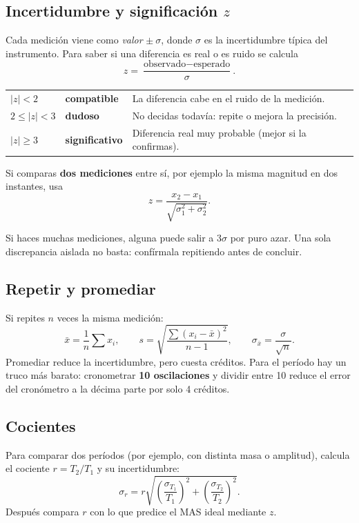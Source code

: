 \documentclass[11pt,a4paper]{article}
\begin{document}
\subsection{Incertidumbre y significación $z$}\label{sec:z}
Cada medición viene como \emph{valor} $\pm\ \sigma$, donde $\sigma$ es la incertidumbre típica del instrumento. Para saber si una diferencia es real o es ruido se calcula
\[
z = \frac{\text{observado} - \text{esperado}}{\sigma}.
\]
\begin{center}
\begin{tabular}{lll}
\toprule
$|z| < 2$ & \textcolor{ok}{\textbf{compatible}} & La diferencia cabe en el ruido de la medición. \\
$2 \le |z| < 3$ & \textcolor{aviso}{\textbf{dudoso}} & No decidas todavía: repite o mejora la precisión. \\
$|z| \ge 3$ & \textcolor{mal}{\textbf{significativo}} & Diferencia real muy probable (mejor si la confirmas). \\
\bottomrule
\end{tabular}
\end{center}

Si comparas \textbf{dos mediciones} entre sí, por ejemplo la misma magnitud en dos instantes, usa
\[
z = \frac{x_2 - x_1}{\sqrt{\sigma_1^2+\sigma_2^2}}.
\]

\begin{idea}
Si haces muchas mediciones, alguna puede salir a $3\sigma$ por puro azar. Una sola discrepancia aislada no basta: confírmala repitiendo antes de concluir.
\end{idea}

\subsection{Repetir y promediar}
Si repites $n$ veces la misma medición:
\[
\bar{x} = \frac{1}{n}\sum x_i, \qquad s = \sqrt{\frac{\sum (x_i-\bar x)^2}{n-1}}, \qquad \sigma_{\bar x} = \frac{\sigma}{\sqrt{n}}.
\]
Promediar reduce la incertidumbre, pero cuesta créditos. Para el período hay un truco más barato: cronometrar \textbf{10 oscilaciones} y dividir entre 10 reduce el error del cronómetro a la décima parte por solo 4 créditos.

\subsection{Cocientes}
Para comparar dos períodos (por ejemplo, con distinta masa o amplitud), calcula el cociente $r = T_2/T_1$ y su incertidumbre:
\[
\sigma_r = r\sqrt{\left(\frac{\sigma_{T_1}}{T_1}\right)^2 + \left(\frac{\sigma_{T_2}}{T_2}\right)^2}.
\]
Después compara $r$ con lo que predice el MAS ideal mediante $z$.
\end{document}
